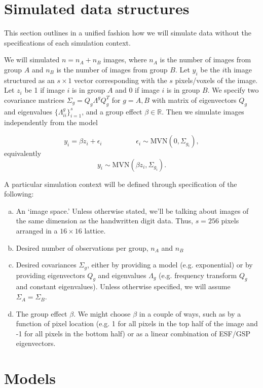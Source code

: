 \documentclass[12pt]{article}
\begin{document}
\section*{Simulated data structures}

This section outlines in a unified fashion how we will simulate data without the specifications of each simulation context.

We will simulated $n=n_A+n_B$ images, where $n_A$ is the number of images from group $A$ and $n_B$ is the number of images from group $B$. Let $y_i$ be the $i$th image structured as an $s\times 1$ vector corresponding with the $s$ pixels/voxels of the image. Let $z_i$ be 1 if image $i$ is in group $A$ and 0 if image $i$ is in group $B$. We specify two covariance matrices $\Sigma_g=Q_g\Lambda^g Q_g^T$ for $g=A,B$ with matrix of eigenvectors $Q_g$ and eigenvalues $\{\Lambda_{ii}^g\}_{i=1}^s$, and a group effect $\beta\in\mathbb R$. Then we simulate images independently from the model

$$y_i =\beta z_i + \epsilon_i\hspace{2cm}\epsilon_i\sim\text{MVN}(0,\Sigma_{g_i}),$$
equivalently
$$y_i\sim\text{MVN}(\beta z_i,\Sigma_{g_i}).$$

A particular simulation context will be defined through specification of the following:
\begin{enumerate}[(a)]
	\item An `image space.' Unless otherwise stated, we'll be talking about images of the same dimension as the handwritten digit data. Thus, $s=256$ pixels arranged in a $16\times16$ lattice.
	\item Desired number of observations per group, $n_A$ and $n_B$
	\item Desired covariances $\Sigma_g$, either by providing a model (e.g. exponential) or by providing eigenvectors $Q_g$ and eigenvalues $\Lambda_g$ (e.g. frequency transform $Q_g$ and constant eigenvalues). Unless otherwise specified, we will assume $\Sigma_A=\Sigma_B$.
	\item The group effect $\beta$. We might choose $\beta$ in a couple of ways, such as by a function of pixel location (e.g. 1 for all pixels in the top half of the image and -1 for all pixels in the bottom half) or as a linear combination of ESF/GSP eigenvectors.
\end{enumerate}


\section*{Models}
\end{document}
